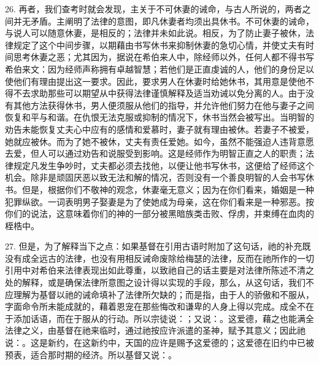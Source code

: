 26. 再者，我们查考时就会发现，主关于不可休妻的诫命，与古人所说的，两者之间并无矛盾。主阐明了法律的意图，即凡休妻者均须出具休书。不可休妻的诫命，与说人可以随意休妻，是相反的；法律并未如此说。相反，为了防止妻子被休，法律规定了这个中间步骤，以期藉由书写休书来抑制休妻的急切心情，并使丈夫有时间思考休妻之恶；尤其因为，据说在希伯来人中，除经师以外，任何人都不得书写希伯来文：因为经师声称拥有卓越智慧；若他们是正直虔诚的人，他们的身份足以使他们有理由提出这一要求。因此，要求男人在休妻时给她休书，其用意是使他不得不去求助那些可以期望从中获得法律谨慎解释及适当劝诫以免分离的人。由于没有其他方法获得休书，男人便须服从他们的指导，并允许他们努力在他与妻子之间恢复和平与和谐。在仇恨无法克服或抑制的情况下，休书当然会被写出。当明智的劝告未能恢复丈夫心中应有的感情和爱慕时，妻子就有理由被休。若妻子不被爱，她就应被休。而为了她不被休，丈夫有责任爱她。如今，虽然不能强迫人违背意愿去爱，但人可以通过劝告和说服受到影响。这是经师作为明智正直之人的职责；法律规定凡发生争吵时，丈夫都必须去找他，以便让他书写休书，这便给了经师这个机会。除非是顽固厌恶以致无法和解的情况，否则没有一个善良明智的人会书写休书。但是，根据你们不敬神的观念，休妻毫无意义；因为在你们看来，婚姻是一种犯罪纵欲。一词表明男子娶妻是为了使她成为母亲，这在你们看来是一种邪恶。按你们的说法，这意味着你们的神的一部分被黑暗族类击败、俘虏，并束缚在血肉的桎梏中。\par

27. 但是，为了解释当下之点：如果基督在引用古语时附加了这句话，祂的补充既没有成全远古的法律，也没有用相反诫命废除给梅瑟的法律，反而在祂所作的一切引用中对希伯来法律表现出如此尊重，以致祂自己的话主要是对法律所陈述不清之处的解释，或是确保法律所意图之设计得以实现的手段，那么，从这句话，我们不应理解为基督以祂的诫命填补了法律所欠缺的；而是指，由于人的骄傲和不服从，字面命令所未能成就的，藉着恩宠在那些悔改和谦卑的人身上得以完成。成全不在于添加话语，而在于服从的行动。所以宗徒说：；又说：。这爱德，藉之也能满全法律之义，由基督在祂来临时，通过祂按应许派遣的圣神，赋予其意义；因此祂说：。这是新约，在这新约中，天国的应许是赐予这爱德的；这爱德在旧约中已被预表，适合那时期的经济。所以基督又说：。\par

